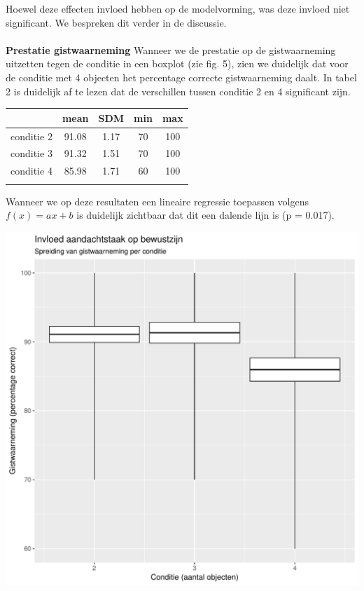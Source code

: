 \documentclass[a0,portrait]{a0poster}
\begin{document}
\begin{multicols}{3}
\begin{center}
\end{center}\vspace{1cm}
Hoewel deze effecten invloed hebben op de modelvorming, was deze invloed niet significant. We bespreken dit verder in de discussie.\\\\
\textbf{Prestatie gistwaarneming} Wanneer we de prestatie op de gistwaarneming uitzetten tegen de conditie in een boxplot (zie fig. 5), zien we duidelijk dat voor de conditie met 4 objecten het percentage correcte gistwaarneming daalt. In tabel 2 is duidelijk af te lezen dat de verschillen tussen conditie 2 en 4 significant zijn. 
\begin{center}
\begin{tabular}{c c c c c}
	 &  mean  & SDM & min & max\\
	\hline
	conditie 2 & 91.08 & 1.17 & 70 & 100\\
	conditie 3 & 91.32 & 1.51 & 70 & 100\\
	conditie 4 & 85.98 & 1.71 & 60 & 100\\
	\hline\\
\end{tabular}
\end{center}
Wanneer we op deze resultaten een lineaire regressie toepassen volgens $f(x)=a x+b$ is duidelijk zichtbaar dat dit een dalende lijn is (p = 0.017).
\begin{center}\vspace{1cm}
	\includegraphics[width=0.8\linewidth]{boxplotGist-conditie.pdf}

\end{center}
\end{multicols}
\end{document}
